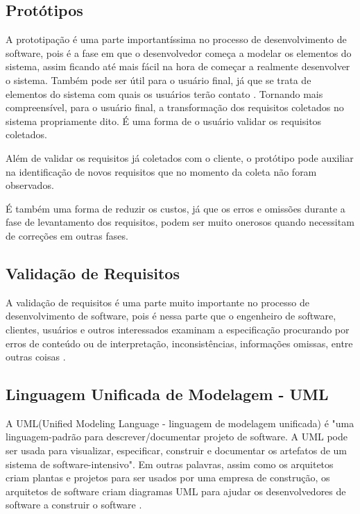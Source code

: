 \subsection{Protótipos}
\label{subsec:prototipacao}

A prototipação é uma parte importantíssima no processo de desenvolvimento de
software, pois é a fase em que o desenvolvedor começa a modelar os elementos do
sistema, assim ficando até mais fácil na hora de começar a realmente 
desenvolver o sistema. Também pode ser útil para o usuário final, já que se 
trata de elementos do sistema com quais os usuários terão contato
\cite{Pressman:2010}. Tornando mais compreensível, para o usuário final, a
transformação dos requisitos coletados no sistema propriamente dito. É uma forma de o usuário 
validar os requisitos coletados.

Além de validar os requisitos já coletados com o cliente, o protótipo pode 
auxiliar na identificação de novos requisitos que no momento da coleta não foram 
observados. 

É também uma forma de reduzir os custos, já que os erros e omissões 
durante a fase de levantamento dos requisitos, podem ser muito onerosos quando 
necessitam de correções em outras fases. 

\subsection{Validação de Requisitos}
\label{subsec:validacaoRequisitos}

A validação de requisitos é uma parte muito importante no processo de
desenvolvimento de software, pois é nessa parte que o engenheiro de software,
clientes, usuários e outros interessados examinam a especificação procurando 
por erros de conteúdo ou de interpretação, inconsistências, informações 
omissas, entre outras coisas \cite{Pressman:2010}.

\subsection{Linguagem Unificada de Modelagem - UML}
\label{subsec:uml}

A UML(Unified Modeling Language - linguagem de modelagem unificada) é "uma
linguagem-padrão para descrever/documentar projeto de software. A UML pode ser
usada para visualizar, especificar, construir e documentar os artefatos de um
sistema de software-intensivo". Em outras palavras, assim como os arquitetos
criam plantas e projetos para ser usados por uma empresa de construção, os
arquitetos de software criam diagramas UML para ajudar os desenvolvedores de
software a construir o software \cite{Pressman:2011}.

